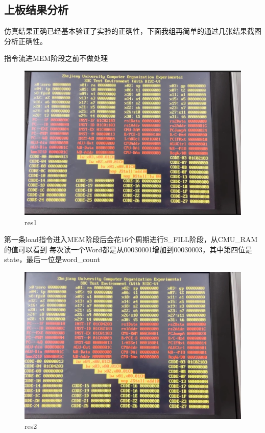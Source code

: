 \subsection{上板结果分析}
仿真结果正确已经基本验证了实验的正确性，下面我组再简单的通过几张结果截图分析正确性。

指令流进MEM阶段之前不做处理
\begin{figure} [H]
    \centering
    \includegraphics[width=1.0\textwidth]{figs/res1.png}
    \caption{res1}
    \label{Fig.14}
\end{figure}

第一条load指令进入MEM阶段后会花16个周期进行S\_FILL阶段，从CMU\_RAM的值可以看到
每次读一个Word都是从00030001增加到00030003，其中第四位是state，最后一位是word\_count

\begin{figure}[H]
    \centering
    \includegraphics[width=1.0\textwidth]{figs/res2.png}
    \caption{res2}
    \label{Fig.15}
\end{figure}

